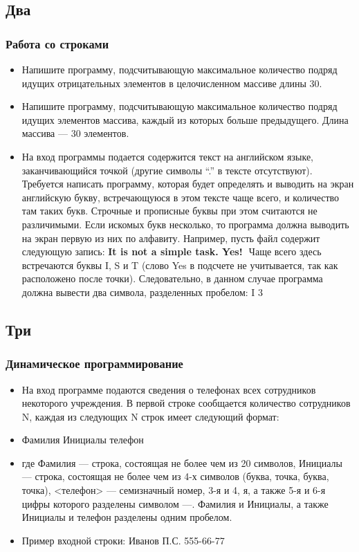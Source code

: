 \documentclass[compress,red]{beamer}
\begin{document}
\subsection{Два}
\begin{frame}[fragile]
  \frametitle{Работа со строками}
  \begin{itemize}
    \item Напишите программу, подсчитывающую максимальное количество подряд идущих отрицательных элементов в целочисленном массиве длины 30.
    \item Напишите программу, подсчитывающую максимальное количество подряд идущих элементов массива, каждый из которых больше предыдущего. Длина массива — 30 элементов.
    \item На вход программы подается содержится текст на английском языке, заканчивающийся точкой (другие символы “.” в тексте отсутствуют). Требуется написать программу, которая будет определять и выводить на экран английскую букву, встречающуюся в этом тексте чаще всего, и количество там таких букв. Строчные и прописные буквы при этом считаются не различимыми. Если искомых букв несколько, то программа должна выводить на экран первую из них по алфавиту. Например, пусть файл содержит следующую запись: \textbf{It is not a simple task. Yes!}  Чаще всего здесь встречаются буквы I, S и T (слово Yes в подсчете не учитывается, так как расположено после точки). Следовательно, в данном случае программа должна вывести два символа, разделенных пробелом: I 3
  \end{itemize}
\end{frame}

\subsection{Три}
\begin{frame}[fragile]
  \frametitle{Динамическое программирование}
  \begin{itemize}
    \item На вход программе подаются сведения о телефонах всех сотрудников некоторого учреждения. В первой строке сообщается количество сотрудников N, каждая из следующих N строк имеет следующий формат: 
    \item Фамилия Инициалы телефон
    \item где Фамилия --- строка, состоящая не более чем из 20 символов, Инициалы --- строка, состоящая не более чем из 4-х символов (буква, точка, буква, точка), <телефон> --- семизначный номер, 3-я и 4, я, а также 5-я и 6-я цифры которого разделены символом ---. Фамилия и Инициалы, а также Инициалы и телефон разделены одним пробелом.
    \item Пример входной строки: Иванов П.С. 555-66-77
  \end{itemize}
\end{frame}
\end{document}
